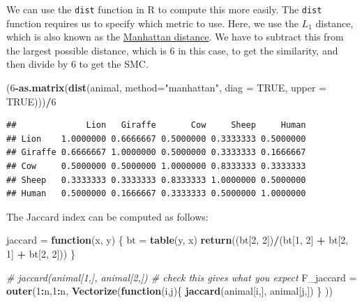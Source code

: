 \documentclass[]{book}
\newenvironment{Shaded}{\begin{snugshade}}{\end{snugshade}}
\newcommand{\CommentTok}[1]{\textcolor[rgb]{0.56,0.35,0.01}{\textit{#1}}}
\newcommand{\ControlFlowTok}[1]{\textcolor[rgb]{0.13,0.29,0.53}{\textbf{#1}}}
\newcommand{\DataTypeTok}[1]{\textcolor[rgb]{0.13,0.29,0.53}{#1}}
\newcommand{\DecValTok}[1]{\textcolor[rgb]{0.00,0.00,0.81}{#1}}
\newcommand{\KeywordTok}[1]{\textcolor[rgb]{0.13,0.29,0.53}{\textbf{#1}}}
\newcommand{\NormalTok}[1]{#1}
\newcommand{\OperatorTok}[1]{\textcolor[rgb]{0.81,0.36,0.00}{\textbf{#1}}}
\newcommand{\OtherTok}[1]{\textcolor[rgb]{0.56,0.35,0.01}{#1}}
\newcommand{\StringTok}[1]{\textcolor[rgb]{0.31,0.60,0.02}{#1}}
\theoremstyle{definition}
\theoremstyle{definition}
\theoremstyle{definition}
\theoremstyle{remark}
\begin{document}
We can use the \texttt{dist} function in R to compute this more easily. The \texttt{dist} function requires us to specify which metric to use. Here, we use the \(L_1\) distance, which is also known as the \href{https://en.wikipedia.org/wiki/Taxicab_geometry}{Manhattan distance}. We have to subtract this from the largest possible distance, which is 6 in this case, to get the similarity, and then divide by 6 to get the SMC.

\begin{Shaded}
\begin{Highlighting}[]
\NormalTok{(}\DecValTok{6}\OperatorTok{-}\KeywordTok{as.matrix}\NormalTok{(}\KeywordTok{dist}\NormalTok{(animal, }\DataTypeTok{method=}\StringTok{"manhattan"}\NormalTok{, }\DataTypeTok{diag =} \OtherTok{TRUE}\NormalTok{, }\DataTypeTok{upper =} \OtherTok{TRUE}\NormalTok{)))}\OperatorTok{/}\DecValTok{6}
\end{Highlighting}
\end{Shaded}

\begin{verbatim}
##              Lion   Giraffe       Cow     Sheep     Human
## Lion    1.0000000 0.6666667 0.5000000 0.3333333 0.5000000
## Giraffe 0.6666667 1.0000000 0.5000000 0.3333333 0.1666667
## Cow     0.5000000 0.5000000 1.0000000 0.8333333 0.3333333
## Sheep   0.3333333 0.3333333 0.8333333 1.0000000 0.5000000
## Human   0.5000000 0.1666667 0.3333333 0.5000000 1.0000000
\end{verbatim}

The Jaccard index can be computed as follows:

\begin{Shaded}
\begin{Highlighting}[]
\NormalTok{jaccard =}\StringTok{ }\ControlFlowTok{function}\NormalTok{(x, y) \{}
\NormalTok{  bt =}\StringTok{ }\KeywordTok{table}\NormalTok{(y, x)}
  \KeywordTok{return}\NormalTok{((bt[}\DecValTok{2}\NormalTok{, }\DecValTok{2}\NormalTok{])}\OperatorTok{/}\NormalTok{(bt[}\DecValTok{1}\NormalTok{, }\DecValTok{2}\NormalTok{] }\OperatorTok{+}\StringTok{ }\NormalTok{bt[}\DecValTok{2}\NormalTok{, }\DecValTok{1}\NormalTok{] }\OperatorTok{+}\StringTok{ }\NormalTok{bt[}\DecValTok{2}\NormalTok{, }\DecValTok{2}\NormalTok{]))}
\NormalTok{\}}

\CommentTok{# jaccard(animal[1,], animal[2,]) # check this gives what you expect}
\NormalTok{F_jaccard =}\StringTok{ }\KeywordTok{outer}\NormalTok{(}\DecValTok{1}\OperatorTok{:}\NormalTok{n,}\DecValTok{1}\OperatorTok{:}\NormalTok{n, }\KeywordTok{Vectorize}\NormalTok{(}\ControlFlowTok{function}\NormalTok{(i,j)\{}
  \KeywordTok{jaccard}\NormalTok{(animal[i,], animal[j,])}
\NormalTok{  \}}
\NormalTok{  ))}
\end{Highlighting}
\end{Shaded}
\end{document}
